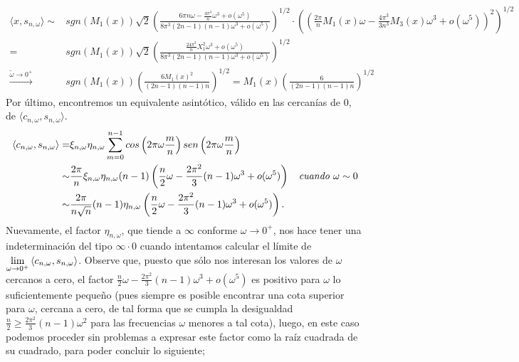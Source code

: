 \begin{align*}
\langle x,
s_{n, \omega}
\rangle \sim &
sgn(M_{1}(x))
\sqrt{2} 
\left(
\frac{
6 \pi n \omega -
\frac{4 \pi^{3}}{n} \omega^{3} + o(\omega^{5})
}{8 \pi^{3} (2n-1)(n-1)\omega^{3} + o(\omega^{5})
}
\right)^{1/2}
\cdot 
\left(
\left(
\frac{2 \pi}{n} M_{1}(x) \omega - \frac{4 \pi^{3}}{3n^{3}}M_{3}(x) \omega^{3} 
 + o(\omega^{5})
\right)^{2}
\right)^{1/2}\\
= & 
sgn(M_{1}(x)) \sqrt{2} \left(
\frac{
\frac{24 \pi^{3}}{n}X_{1}^{2}\omega^{3} + o(\omega^{5}) }{
8 \pi^{3} (2n-1)(n-1)\omega^{3} + o(\omega^{5})
}
\right)^{1/2} \\
\xrightarrow{\tilde{\omega} \rightarrow 0^{+}}& sgn(M_{1}(x))\left(
\frac{6 M_{1}(x)^{2}}{(2n-1)(n-1)n}
\right)^{1/2} 
= M_{1}(x) 
\left(
\frac{6 }{(2n-1)(n-1)n}
\right)^{1/2} 
\end{align*}
Por último, encontremos un equivalente
asintótico, válido en las cercanías de $0$, de 
$\langle
c_{n, \omega}, s_{n, \omega}
\rangle $.
\begin{align*}
\langle
c_{n, \omega}, s_{n, \omega}
\rangle = &
\xi_{n, \omega} \eta_{n, \omega}
\sum\limits_{m=0}^{n-1}
cos\left(
2 \pi \omega\frac{m}{n}
\right)
sen\left(
2 \pi \omega\frac{m}{n}
\right)
 \\
\sim &
\frac{2\pi}{n}
\xi_{n, \omega} \eta_{n, \omega}
(n-1)  
\left(
\frac{n}{2} \omega - \frac{2\pi^{2}}{3} (n-1) \omega^{3} + o(\omega^{5})
\right) 
\hspace{0.2cm} \textit{ cuando } \omega \sim 0
\\
\sim &
\frac{2\pi}{n \sqrt{n}}
(n-1) 
\eta_{n, \omega} 
\left(
\frac{n}{2} \omega - \frac{2\pi^{2}}{3} (n-1) \omega^{3} + o(\omega^{5})
\right). \\
\end{align*}
Nuevamente, el factor 
$\eta_{n, \omega}$, que tiende a $\infty$
conforme $\omega \rightarrow 0^{+}$,
nos hace tener una indeterminación
del tipo $\infty \cdot 0$
cuando intentamos calcular el límite
de 
$
\lim\limits_{\omega \rightarrow 0^{+}}{
\langle
c_{n, \omega}, s_{n, \omega}
\rangle}
$.
Observe que, puesto que sólo nos interesan los valores
de $\omega$ cercanos a cero, el factor 
$
\frac{n}{2} \omega - \frac{2\pi^{2}}{3} (n-1) \omega^{3} + o(\omega^{5})
$
es positivo 
para $\omega$ lo suficientemente pequeño
(pues siempre es posible encontrar una cota
superior para $\omega$, cercana a cero, de tal forma que se 
cumpla la desigualdad $\frac{n}{2} \geq \frac{2 \pi^{2}}{3}(n-1)
\omega^{2}$ para las frecuencias $\omega$ menores a tal cota), luego, 
en este caso podemos proceder sin problemas a expresar este
factor
como la raíz cuadrada de su cuadrado, para poder concluir lo siguiente; 


